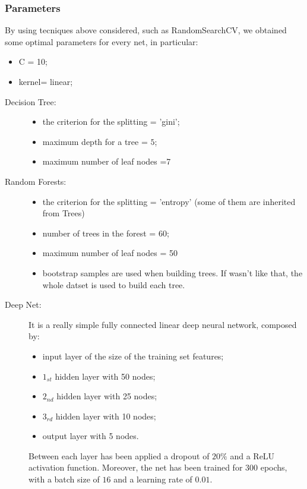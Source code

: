 \documentclass{article}
\begin{document}

\subsubsection{Parameters}

By using tecniques above considered, such as RandomSearchCV, we obtained some optimal parameters for every net, in particular:

\begin{description}[align=left]
\item [SVM:]
\begin{itemize}
\item C = 10;
\item kernel= linear;
\end{itemize}
\end{description}

\begin{description}
\item [Decision Tree:] 
\begin{itemize}
\item the criterion for the splitting = 'gini';
\item maximum depth for a tree = $5$;
\item maximum number of leaf nodes =7
\end{itemize}
\end{description}

\begin{description}
\item[Random Forests:]\begin{itemize}

\item the criterion for the splitting = 'entropy' (some of them are inherited from Trees)
\item number of trees in the forest = 60;
\item maximum number of leaf nodes = 50
\item bootstrap samples are used when building trees. If wasn't like that, the whole datset is used to build each tree.\end{itemize}
\end{description}
                            
\begin{description}
\item [Deep Net:] It is a really simple fully connected linear deep neural network, composed by: \begin{itemize}
\item input layer of the size of the training set features;
\item $1_{st}$ hidden layer with 50 nodes;
\item $2_{nd}$ hidden layer with 25 nodes;
\item $3_{rd}$ hidden layer with 10 nodes;
\item output layer with 5 nodes.
\end{itemize}
Between each layer has been applied a dropout of $20\%$  and a ReLU activation function. Moreover, the net has been trained for $300$ epochs, with a batch size of $16$ and a learning rate of $0.01$.
\end{description}
\end{document}
